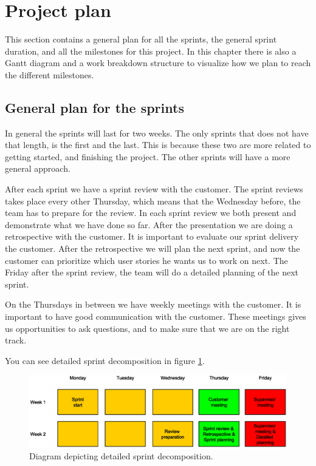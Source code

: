 \section{Project plan}
This section contains a general plan for all the sprints, the general sprint duration, and all the milestones for this project. In this chapter there is also a Gantt diagram and a work breakdown structure to visualize how we plan to reach the different milestones.

\subsection{General plan for the sprints}
In general the sprints will last for two weeks. The only sprints that does not have that length, is the first and the last. This is because these two are more related to getting started, and finishing the project. The other sprints will have a more general approach. 

After each sprint we have a sprint review with the customer. The sprint reviews takes place every other Thursday, which means that the Wednesday before, the team has to prepare for the review. In each sprint review we both present and demonstrate what we have done so far. After the presentation we are doing a retrospective with the customer. It is important to evaluate our sprint delivery the customer. After the retrospective we will plan the next sprint, and now the customer can prioritize which user stories he wants us to work on next. The Friday after the sprint review, the team will do a detailed planning of the next sprint. 

On the Thursdays in between we have weekly meetings with the customer. It is important to have good communication with the customer. These meetings gives us opportunities to ask questions, and to make sure that we are on the right track.

You can see detailed sprint decomposition in figure \ref{img:sprint_detail}.
\begin{figure}[h!]
    \begin{center}
    \includegraphics[scale=0.5]{images/sprint_detail.eps}
    \caption{Diagram depicting detailed sprint decomposition.}
    \label{img:sprint_detail}
    \end{center}
\end{figure}


